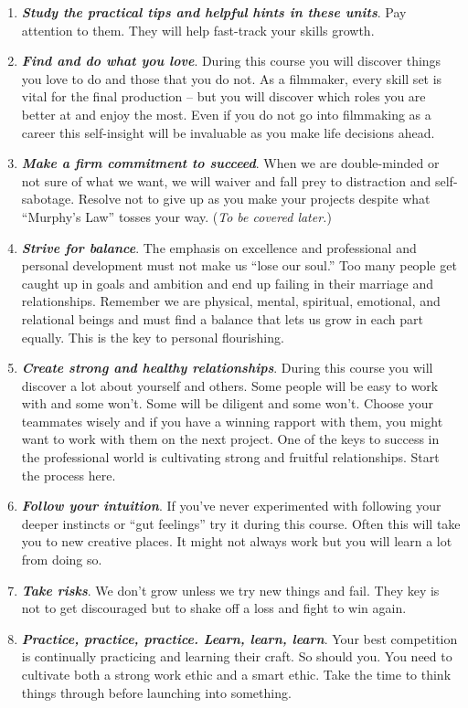 \documentclass[
]{book}
\begin{document}
\begin{enumerate}
\item
  \textbf{\emph{Study the practical tips and helpful hints in these units}}. Pay attention to them. They will help fast-track your skills growth.
\item
  \textbf{\emph{Find and do what you love}}. During this course you will discover things you love to do and those that you do not. As a filmmaker, every skill set is vital for the final production -- but you will discover which roles you are better at and enjoy the most. Even if you do not go into filmmaking as a career this self-insight will be invaluable as you make life decisions ahead.
\item
  \textbf{\emph{Make a firm commitment to succeed}}. When we are double-minded or not sure of what we want, we will waiver and fall prey to distraction and self-sabotage. Resolve not to give up as you make your projects despite what ``Murphy's Law'' tosses your way. (\emph{To be covered later.})
\item
  \textbf{\emph{Strive for balance}}. The emphasis on excellence and professional and personal development must not make us ``lose our soul.'' Too many people get caught up in goals and ambition and end up failing in their marriage and relationships. Remember we are physical, mental, spiritual, emotional, and relational beings and must find a balance that lets us grow in each part equally. This is the key to personal flourishing.
\item
  \textbf{\emph{Create strong and healthy relationships}}. During this course you will discover a lot about yourself and others. Some people will be easy to work with and some won't. Some will be diligent and some won't. Choose your teammates wisely and if you have a winning rapport with them, you might want to work with them on the next project. One of the keys to success in the professional world is cultivating strong and fruitful relationships. Start the process here.
\item
  \textbf{\emph{Follow your intuition}}. If you've never experimented with following your deeper instincts or ``gut feelings'' try it during this course. Often this will take you to new creative places. It might not always work but you will learn a lot from doing so.
\item
  \textbf{\emph{Take risks}}. We don't grow unless we try new things and fail. They key is not to get discouraged but to shake off a loss and fight to win again.
\item
  \textbf{\emph{Practice, practice, practice. Learn, learn, learn}}. Your best competition is continually practicing and learning their craft. So should you. You need to cultivate both a strong work ethic and a smart ethic. Take the time to think things through before launching into something.

\end{enumerate}
\end{document}
